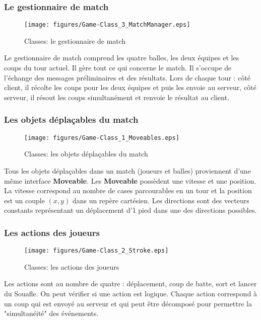 \subsubsection{Le gestionnaire de match}
\begin{figure}[h!]
  \centering
  \texttt{[image: figures/Game-Class\_3\_MatchManager.eps]}
  \caption{\label{fig:Class:MatchManager} Classes: le gestionnaire de match}
\end{figure}

Le gestionnaire de match comprend les quatre balles, les deux équipes et les coups du 
tour actuel. Il gère tout ce qui concerne le match. Il s'occupe de l'échange 
des messages préliminaires et des résultats. Lors de chaque tour : côté 
client, il récolte les coups pour les deux équipes et puis les envoie au 
\gls{serveur}, côté serveur, il résout les coups simultanément et renvoie le résultat 
au \gls{client}.

\subsubsection{Les objets déplaçables du match}
\begin{figure}[h!]
  \centering
  \texttt{[image: figures/Game-Class\_1\_Moveables.eps]}
  \caption{\label{fig:Class:GameMoveables} Classes: les objets déplaçables du match}
\end{figure}

Tous les objets déplaçables dans un match (joueurs et balles) proviennent d'une 
même interface \textbf{Moveable}. Les \textbf{Moveable} possèdent une vitesse 
et une position. La vitesse correspond au nombre de cases parcourables en un tour 
et la position est un couple $(x,y)$ dans un repère cartésien. Les directions sont des vecteurs constants représentant un déplacement d'1 pied dans une des directions possibles.

\subsubsection{Les actions des joueurs}
\begin{figure}[h!]
  \centering
  \texttt{[image: figures/Game-Class\_2\_Stroke.eps]}
  \caption{\label{fig:Class:Stroke} Classes: les actions des joueurs}
\end{figure}

Les actions sont au nombre de quatre : déplacement, coup de batte, sort et lancer 
du Souafle. On peut vérifier si une action est logique. Chaque action correspond 
à un coup qui est envoyé au \gls{serveur} et qui peut être décomposé pour permettre la 
"simultanéité" des événements.

